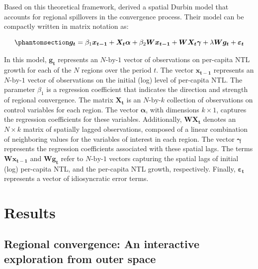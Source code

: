 \documentclass[
  a4paper, 
  twoside,
  review
]{article}
\begin{document}
Based on this theoretical framework, \citet{ertur_koch_spatial_growth}
derived a spatial Durbin model that accounts for regional spillovers in
the convergence process. Their model can be compactly written in matrix
notation as:

\begin{equation}\phantomsection\label{eq-matrix_form}{
\boldsymbol{g_t} =  \beta_1 \boldsymbol{x_{t-1}} + \boldsymbol{X_t} \boldsymbol{\alpha} + \beta_2 \boldsymbol{W} \boldsymbol{x_{t-1}} + \boldsymbol{W} \boldsymbol{X_t} \boldsymbol{\gamma} + \lambda \boldsymbol{W} \boldsymbol{g_t}  + \boldsymbol{\varepsilon_t}
}\end{equation}

In this model, \(\boldsymbol{g_t}\) represents an \(N\text{-by-}1\)
vector of observations on per-capita NTL growth for each of the \(N\)
regions over the period \(t\). The vector \(\boldsymbol{x_{t-1}}\)
represents an \(N\text{-by-}1\) vector of observations on the initial
(log) level of per-capita NTL. The parameter \(\beta_1\) is a regression
coefficient that indicates the direction and strength of regional
convergence. The matrix \(\boldsymbol{X_t}\) is an \(N\text{-by-}k\)
collection of observations on control variables for each region. The
vector \(\boldsymbol{\alpha}\), with dimensions \(k \times 1\), captures
the regression coefficients for these variables. Additionally,
\(\boldsymbol{W}\boldsymbol{X_t}\) denotes an \(N \times k\) matrix of
spatially lagged observations, composed of a linear combination of
neighboring values for the variables of interest in each region. The
vector \(\boldsymbol{\gamma}\) represents the regression coefficients
associated with these spatial lags. The terms
\(\boldsymbol{W} \boldsymbol{x_{t-1}}\) and
\(\boldsymbol{W} \boldsymbol{g_t}\) refer to \(N\text{-by-}1\) vectors
capturing the spatial lags of initial (log) per-capita NTL, and the
per-capita NTL growth, respectively. Finally,
\(\boldsymbol{\varepsilon_t}\) represents a vector of idiosyncratic
error terms.

\section{Results}\label{results}

\subsection{Regional convergence: An interactive exploration from outer
space}\label{regional-convergence-an-interactive-exploration-from-outer-space}
\end{document}
